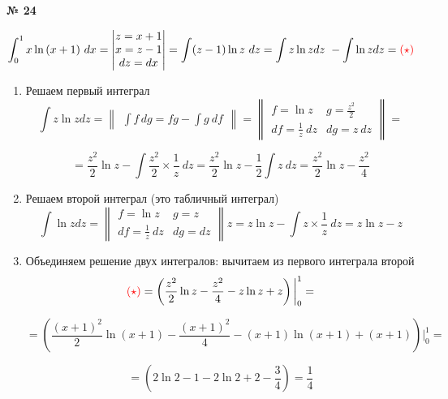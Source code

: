 \documentclass{article}
\begin{document}
\textbf{№ 24} 
\large

$$ \int_{0}^{1} x \ln{(x+1)} \ dx 
= \begin{vmatrix} z = x + 1 \\
                  x = z - 1 \\
                 dz = dx \end{vmatrix}
= \int (z-1) \ln{z} \ dz
= \int z \ln{z}dz \ - \int \ln{z}dz
= \textcolor{red}{(\star)}$$

\begin{enumerate}
\item Решаем первый интеграл
$$ \int z \ln{z} dz
= \begin{Vmatrix} \int f \,dg = fg - \int g \ df \end{Vmatrix} =
  \begin{Vmatrix} f = \ln{z} &  g = \frac{z^2}{2} \\
                 df = \frac{1}{z} \ dz  & dg = z \ dz \end{Vmatrix} 
= $$

$$ = \frac{z^2}{2} \ln{z} - \int \frac{z^2}{2} \times \frac{1}{z} \ dz 
= \frac{z^2}{2} \ln{z} - \frac{1}{2} \int z \ dz 
= \frac{z^2}{2} \ln{z} - \frac{z^2}{4} $$

\item Решаем второй интеграл (это табличный интеграл)
$$ \int \ln{z}dz 
= \begin{Vmatrix} f = \ln{z} &  g = z \\
                 df = \frac{1}{z} \ dz  & dg = dz \end{Vmatrix} z
= z \ln{z} - \int z \times \frac{1}{z} \ dz 
= z \ln{z} - z $$

\item Объединяем решение двух интегралов: вычитаем из первого интеграла второй
$$ \textcolor{red}{(\star)} = \left( \frac{z^2}{2} \ln{z} - \frac{z^2}{4} - z \ln{z} + z \right) \bigg\vert_{0}^{1}
= $$

$$ = \left( \frac{(x+1)^2}{2} \ln{(x+1)} - \frac{(x+1)^2}{4} - (x+1) \ln{(x+1)} + (x+1) \right) \bigg\vert_{0}^{1}
= $$

$$ = \left( 2 \ln{2} - 1 - 2 \ln{2} + 2 - \frac{3}{4} \right) 
= \frac{1}{4}$$

\end{enumerate}
\end{document}
